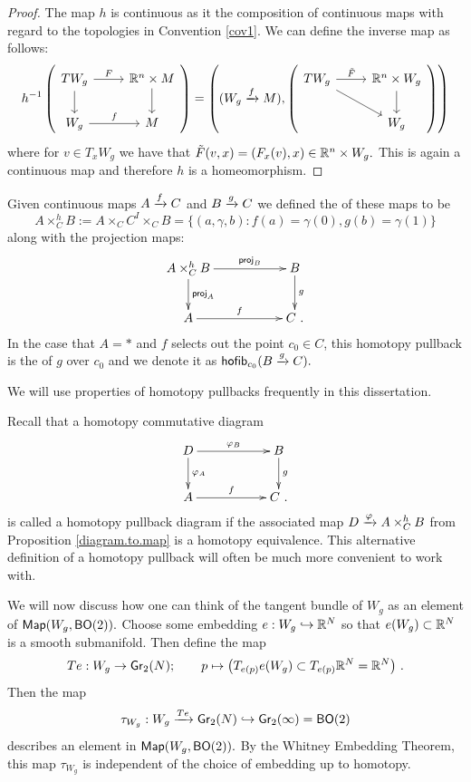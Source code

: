 \begin{proof}
The map $h$ is continuous as it the composition of continuous maps with regard to the topologies in Convention \ref{cov1}.
We can define the inverse map as follows:
\[
h^{-1}\left(\begin{tikzcd}
TW_{g} \arrow[d] \arrow[r, "F"]  & \RR^{n} \times M \arrow[d]\\
W_{g} \arrow[r, "f"] & M
\end{tikzcd} \right) =
\left( (W_{g} \xra{f} M), \left(\begin{tikzcd}
TW_{g} \arrow[rd] \arrow[r, "\tilde{F}"]  & \RR^{n} \times W_{g} \arrow[d]\\
& W_{g}
\end{tikzcd} \right) \right)
\]
where for $v \in T_{x}W_{g}$ we have that $\tilde{F}(v, x) = (F_{x}(v), x) \in \mathbb R^{n} \times W_{g}.$ 
This is again a continuous map and therefore $h$ is a homeomorphism.
\end{proof}


\begin{definition}
Given continuous maps $A \xrightarrow{f} C$ and $B \xrightarrow{g} C$ we defined the  of these maps to be 
\[
A \times_{C}^{h} B := A \times_{C} C^{I} \times_{C} B = \{(a, \gamma, b): f(a) = \gamma(0), g(b) = \gamma(1) \}
\]
along with the projection maps:
\[
\xymatrix{
A \times_{C}^{h} B \ar[rr]^-{{\sf proj}_{B}} \ar[d]^-{{\sf proj}_{A}}
&&
B \ar[d]^-{g}
\\
A \ar[rr]^-{f}
&&
C~.
}
\]
In the case that $A = \ast$ and $f$ selects out the point $c_{0} \in C$, this homotopy pullback is the  of $g$ over $c_{0}$ and we denote it as ${\sf hofib}_{c_{0}}(B \xrightarrow{g} C).$ 
\end{definition}

We will use properties of homotopy pullbacks frequently in this dissertation.

\begin{remark} \label{rem.hpull}
Recall that a homotopy commutative diagram
\[
\xymatrix{
D \ar[rr]^-{\varphi_{B}} \ar[d]^-{\varphi_{A}}
&&
B \ar[d]^-{g}
\\
A \ar[rr]^-{f}
&&
C~.
}
\]
is called a homotopy pullback diagram if the associated map $D \xrightarrow{\varphi} A \times_{C}^{h} B$ from Proposition \ref{diagram.to.map} is a homotopy equivalence.
This alternative definition of a homotopy pullback will often be much more convenient to work with.
\end{remark}


We will now discuss how one can think of the tangent bundle of $W_{g}$ as an element of ${\sf Map}(W_{g}, {\sf BO}(2)).$ Choose some embedding $e: W_{g} \hookrightarrow \mathbb R^{N}$ so that $e(W_{g}) \subset \mathbb R^{N}$ is a smooth submanifold. Then define the map 
\[
Te: W_{g} \rightarrow {\sf Gr}_{2}(N); \hspace{20pt} p \mapsto \big(T_{e(p)}e(W_{g}) \subset T_{e(p)}\mathbb R^{N} = \mathbb R^{N}\big)~.
\]
Then the map
\[
\tau_{W_{g}}: W_{g} \xrightarrow{Te} {\sf Gr}_{2}(N) \hookrightarrow {\sf Gr}_{2}(\infty) = {\sf BO}(2)
\]
describes an element in ${\sf Map}(W_{g}, {\sf BO}(2)).$ By the Whitney Embedding Theorem, this map $\tau_{W_{g}}$ is independent of the choice of embedding up to homotopy.

